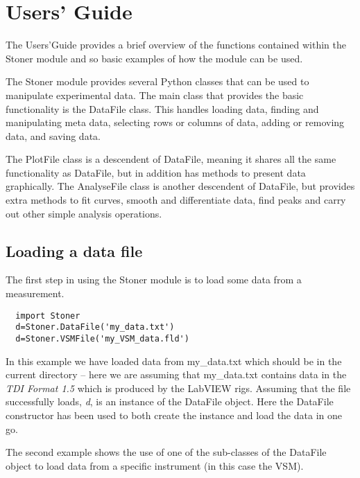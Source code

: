 \documentclass[a4paper,11pt]{scrartcl}
\begin{document}

\section{Users' Guide}

The Users'Guide provides a brief overview of the functions contained within the
Stoner module and so basic examples of how the module can be used.

The Stoner module provides several Python classes that can be used to manipulate
experimental data. The main class that provides the basic functionality is the
DataFile class. This handles loading data, finding and manipulating meta data,
selecting rows or columns of data, adding or removing data, and saving data.

The PlotFile class is a descendent of DataFile, meaning it shares all the same
functionality as DataFile, but in addition has methods to present data
graphically. The AnalyseFile class is another descendent of DataFile, but
provides extra methods to fit curves, smooth and differentiate data, find peaks
and carry out other simple analysis operations.

\subsection{Loading a data file}

The first step in using the Stoner module is to load some data from a
measurement.

\begin{lstlisting}
  import Stoner
  d=Stoner.DataFile('my_data.txt')
  d=Stoner.VSMFile('my_VSM_data.fld')
\end{lstlisting}

In this example we have loaded data from my\_data.txt which should be in the
current directory -- here we are assuming that my\_data.txt contains data in the
\textit{TDI Format 1.5} which is produced by the LabVIEW rigs. Assuming that the
file successfully loads, \textit{d}, is an instance of the DataFile object. Here
the DataFile constructor has been used to both create the instance and load the
data in one go.

The second example shows the use of one of the sub-classes of the DataFile object to load data from a specific instrument (in this case the VSM).
\end{document}
